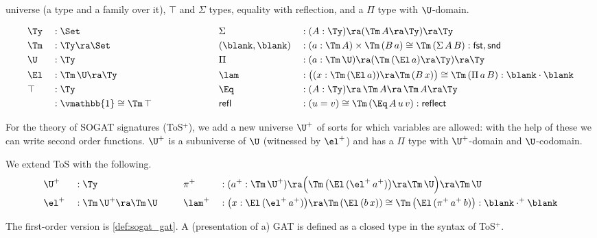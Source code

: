 \setcounter{theorem}{11}
universe (a type and a family over it), $\top$ and $\Sigma$ types,
equality with reflection, and a $\Pi$ type with $\U$-domain.
\pagebreak
\begin{definition}\label{def:gat}
  \begin{alignat*}{10}
    & \Ty && : \Set                                             && \Sigma && :(A:\Ty)\ra(\Tm\,A\ra\Ty)\ra\Ty \\
    & \Tm && : \Ty\ra\Set                                       && (\blank,\blank) && : (a:\Tm\,A)\times\Tm\,(B\,a)\cong\Tm\,(\Sigma\,A\,B) : \mathsf{fst},\mathsf{snd} \\         
    & \U  && : \Ty                                              && \Pi && : (a:\Tm\,\U)\ra(\Tm\,(\El\,a)\ra\Ty)\ra\Ty \\                                                 
    & \El && : \Tm\,\U\ra\Ty                                    && \lam && : \big((x:\Tm\,(\El\,a))\ra\Tm\,(B\,x)\big)\cong\Tm\,(\Pi\,a\,B) : \blank\cdot\blank \\     
    & \top && : \Ty                                             && \Eq && : (A:\Ty)\ra\,\Tm\,A\ra\,\Tm\,A\ra\Ty \\                                                                 
    & \tt && : \vmathbb{1} \cong \Tm\,\top \hspace{6em} && \mathsf{refl} && : (u = v)\cong\Tm\,(\Eq\,A\,u\,v) : \mathsf{reflect}                                    
  \end{alignat*}
\end{definition}
\setcounter{theorem}{12}
For the theory of SOGAT signatures (ToS$^+$), we add a new universe $\U^+$ of sorts for which
variables are allowed: with the help of these we can write second
order functions. $\U^+$ is a subuniverse of $\U$ (witnessed by
$\el^+$) and has a $\Pi$ type with $\U^+$-domain and $\U$-codomain.
\begin{definition}\label{def:sogat}
  We extend ToS with the following.
  \begin{alignat*}{10}
    & \U^+ && : \Ty                                   && \pi^+ && : (a^+ : \Tm\,\U^+)\ra\Big(\Tm\,\big(\El\,(\el^+\,a^+)\big)\ra\Tm\,\U\Big)\ra\Tm\,\U \\                                          
    & \el^+ && : \Tm\,\U^+ \ra \Tm\,\U \hspace{1.7em} && \lam^+ && : \big(x:\El\,(\el^+\,a^+)\big)\ra\Tm\,(\El\,(b\,x))\cong\Tm\,\big(\El\,(\pi^+\,a^+\,b)\big) : \blank\cdot^+\blank    
  \end{alignat*}
\end{definition}
The first-order version is \autoref{def:sogat_gat}. A (presentation of
a) GAT is defined as a closed type in the syntax of ToS$^+$.
\setcounter{theorem}{13}
